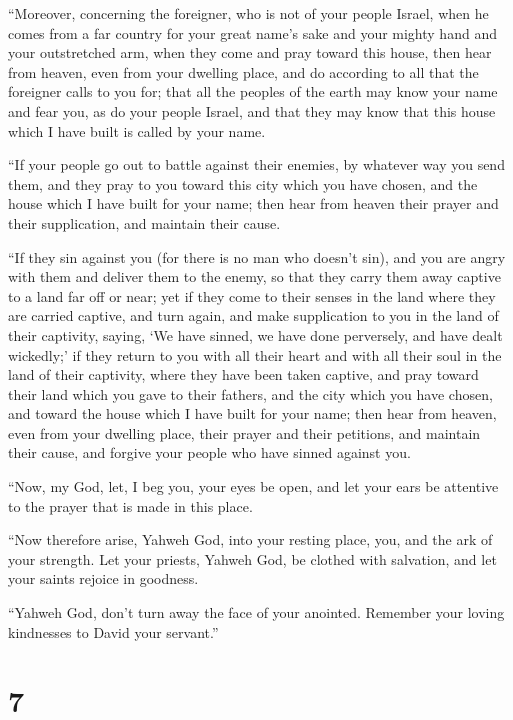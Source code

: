  ``Moreover, concerning the foreigner, who is not of your
people Israel, when he comes from a far country for your great name's
sake and your mighty hand and your outstretched arm, when they come and
pray toward this house,  then hear from heaven, even from
your dwelling place, and do according to all that the foreigner calls to
you for; that all the peoples of the earth may know your name and fear
you, as do your people Israel, and that they may know that this house
which I have built is called by your name.

 ``If your people go out to battle against their enemies,
by whatever way you send them, and they pray to you toward this city
which you have chosen, and the house which I have built for your name;
 then hear from heaven their prayer and their supplication,
and maintain their cause.

 ``If they sin against you (for there is no man who doesn't
sin), and you are angry with them and deliver them to the enemy, so that
they carry them away captive to a land far off or near; 
yet if they come to their senses in the land where they are carried
captive, and turn again, and make supplication to you in the land of
their captivity, saying, `We have sinned, we have done perversely, and
have dealt wickedly;'  if they return to you with all their
heart and with all their soul in the land of their captivity, where they
have been taken captive, and pray toward their land which you gave to
their fathers, and the city which you have chosen, and toward the house
which I have built for your name;  then hear from heaven,
even from your dwelling place, their prayer and their petitions, and
maintain their cause, and forgive your people who have sinned against
you.

 ``Now, my God, let, I beg you, your eyes be open, and let
your ears be attentive to the prayer that is made in this place.

 ``Now therefore arise, Yahweh God, into your resting
place, you, and the ark of your strength. Let your priests, Yahweh God,
be clothed with salvation, and let your saints rejoice in goodness.

 ``Yahweh God, don't turn away the face of your anointed.
Remember your loving kindnesses to David your servant.''

\hypertarget{section-6}{%
\section{7}\label{section-6}}

